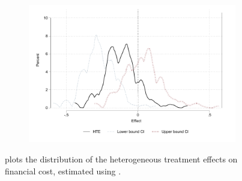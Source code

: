 \documentclass[oneside,11pt]{article}
\begin{document}
\begin{figure}[H]
\begin{center}
\begin{subfigure}{0.45\textwidth}
      \includegraphics[width=\textwidth]{Figuras/he_dist_def_c_pro_2.pdf}
    \end{subfigure}    
    \end{center}
         \scriptsize
     plots the distribution of the heterogeneous treatment effects on financial cost, estimated using \cite{atheygrf}.
\end{figure}
\end{document}
